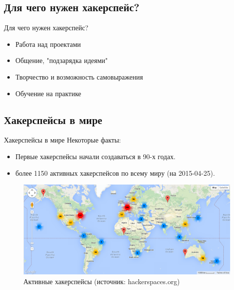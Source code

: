 \documentclass[presentation]{beamer}
\begin{document}
\subsection{Для чего нужен хакерспейс?}

\label{sec-1-2}
\begin{frame}[label=sec-1-2-1]{Для чего нужен хакерспейс?}
  \begin{itemize}
  \item \alert{Работа} над проектами
  \item \alert{Общение}, "подзарядка идеями"
  \item \alert{Творчество} и возможность самовыражения
  \item \alert{Обучение} на практике
  \end{itemize}
\end{frame}

\subsection{Хакерспейсы в мире}

\begin{frame}[label=1-3-1]{Хакерспейсы в мире}
  Некоторые факты:
  \begin{itemize}
    \item Первые хакерспейсы начали создаваться в 90-х годах.
    \item \alert{более 1150} активных хакерспейсов по всему миру (на
      2015-04-25).
  \end{itemize}
  \begin{figure}[htb]
    \centering
    \includegraphics[width=.9\linewidth]{active-hackerspaces-2015-04-25}
    \caption{Активные хакерспейсы (источник: hackerspaces.org)}
  \end{figure}
\end{frame}
\end{document}
